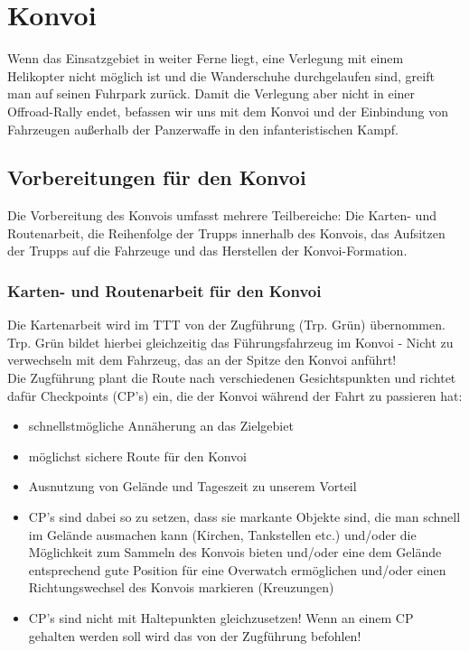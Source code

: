 \newpage
\section{Konvoi}
	Wenn das Einsatzgebiet in weiter Ferne liegt, eine Verlegung mit einem Helikopter nicht möglich ist und die Wanderschuhe durchgelaufen sind, greift man auf seinen Fuhrpark zurück. Damit die Verlegung aber nicht in einer Offroad-Rally endet, befassen wir uns mit dem Konvoi und der Einbindung von Fahrzeugen außerhalb der Panzerwaffe in den infanteristischen Kampf. 

\subsection{Vorbereitungen für den Konvoi}
	Die Vorbereitung des Konvois umfasst mehrere Teilbereiche: Die Karten- und Routenarbeit, die Reihenfolge der Trupps innerhalb des Konvois, das Aufsitzen der Trupps auf die Fahrzeuge und das Herstellen der Konvoi-Formation.

\subsubsection{Karten- und Routenarbeit für den Konvoi}
	Die Kartenarbeit wird im TTT von der Zugführung (Trp. Grün)  übernommen. Trp. Grün bildet hierbei gleichzeitig das Führungsfahrzeug im Konvoi - Nicht zu verwechseln mit dem Fahrzeug, das an der Spitze den Konvoi anführt! \\
	Die Zugführung plant die Route nach verschiedenen Gesichtspunkten und richtet dafür Checkpoints (CP's) ein, die der Konvoi während der Fahrt zu passieren hat: 

	\begin{itemize}
		\item schnellstmögliche Annäherung an das Zielgebiet
		\item möglichst sichere Route für den Konvoi
		\item Ausnutzung von Gelände und Tageszeit zu unserem Vorteil
		\item CP's sind dabei so zu setzen, dass sie markante Objekte sind, die man schnell im Gelände ausmachen kann (Kirchen, Tankstellen etc.) und/oder die Möglichkeit zum Sammeln des Konvois bieten und/oder eine dem Gelände entsprechend gute Position für eine Overwatch ermöglichen und/oder einen Richtungswechsel des Konvois markieren (Kreuzungen)
		\item CP's sind nicht mit Haltepunkten gleichzusetzen! Wenn an einem CP gehalten werden soll wird das von der Zugführung befohlen!
	\end{itemize}

